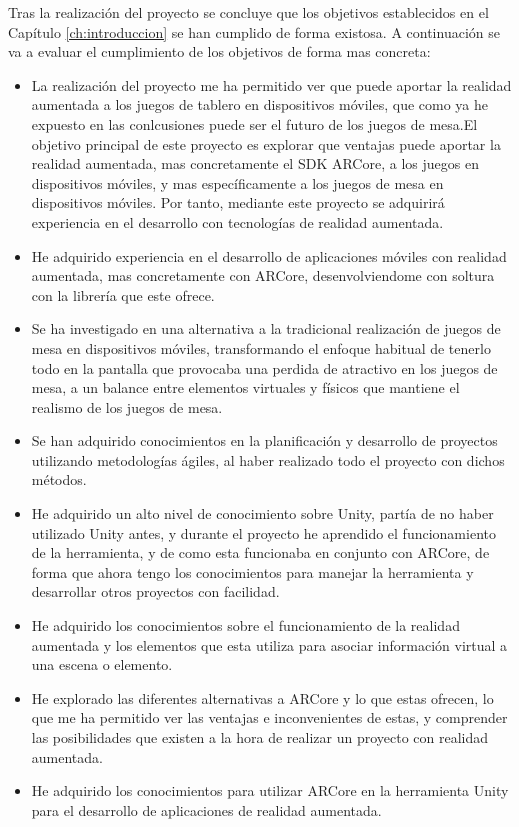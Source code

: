 Tras la realización del proyecto se concluye que los objetivos establecidos en el Capítulo \ref{ch:introduccion} se han cumplido de forma existosa. A continuación se va a evaluar el cumplimiento de los objetivos de forma mas concreta:

\begin{itemize}
  \item La realización del proyecto me ha permitido ver que puede aportar la realidad aumentada a los juegos de tablero en dispositivos móviles, que como ya he expuesto en las conlcusiones puede ser el futuro de los juegos de mesa.El objetivo principal de este proyecto es explorar que ventajas puede aportar la realidad aumentada, mas concretamente el SDK ARCore, a los juegos en dispositivos móviles, y mas específicamente a los juegos de mesa en dispositivos móviles. Por tanto, mediante este proyecto se adquirirá experiencia en el desarrollo con tecnologías de realidad aumentada.

  \item He adquirido experiencia en el desarrollo de aplicaciones móviles con realidad aumentada, mas concretamente con ARCore, desenvolviendome con soltura con la librería que este ofrece.

  \item Se ha investigado en una alternativa a la tradicional realización de juegos de mesa en dispositivos móviles, transformando el enfoque habitual de tenerlo todo en la pantalla que provocaba una perdida de atractivo en los juegos de mesa, a un balance entre elementos virtuales y físicos que mantiene el realismo de los juegos de mesa.

  \item Se han adquirido conocimientos en la planificación y desarrollo de proyectos utilizando metodologías ágiles, al haber realizado todo el proyecto con dichos métodos.

  \item He adquirido un alto nivel de conocimiento sobre Unity, partía de no haber utilizado Unity antes, y durante el proyecto he aprendido el funcionamiento de la herramienta, y de como esta funcionaba en conjunto con ARCore, de forma que ahora tengo los conocimientos para manejar la herramienta y desarrollar otros proyectos con facilidad.

  \item He adquirido los conocimientos sobre el funcionamiento de la realidad aumentada y los elementos que esta utiliza para asociar información virtual a una escena o elemento.

  \item He explorado las diferentes alternativas a ARCore y lo que estas ofrecen, lo que me ha permitido ver las ventajas e inconvenientes de estas, y comprender las posibilidades que existen a la hora de realizar un proyecto con realidad aumentada.

  \item He adquirido los conocimientos para utilizar ARCore en la herramienta Unity para el desarrollo de aplicaciones de realidad aumentada.

\end{itemize}

